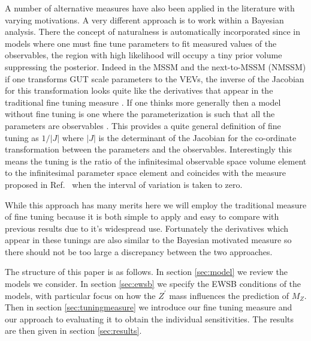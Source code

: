 \documentclass[preprint,amsmath,amssymb,aps,superscriptaddress,prd,
showpacs,floatfix,nofootinbib]{revtex4-1}
\begin{document}
A number of alternative measures have also been applied in the
literature \cite{Anderson:1994dz, Anderson:1994tr, Anderson:1995cp,
Anderson:1996ew, Ciafaloni:1996zh, Chan:1997bi, Barbieri:1998uv,
Giusti:1998gz, Casas:2003jx, Casas:2004uu, Casas:2004gh,
Casas:2006bd, Kitano:2005wc, Athron:2007ry, Athron:2007qr,
Baer:2012up} with varying motivations.  A very different approach is
to work within a Bayesian analysis.  There the concept of naturalness
is automatically incorporated since in models where one must fine tune
parameters to fit measured values of the observables, the region with
high likelihood will occupy a tiny prior volume \cite{Allanach:2007qk,
Cabrera:2008tj, Ghilencea:2012gz, Ghilencea:2012qk, Fichet:2012sn,
Kim:2013uxa} suppressing the posterior.  Indeed in the MSSM and
the next-to-MSSM (NMSSM) if one transforms GUT scale parameters to the
VEVs, the inverse of the Jacobian for this transformation looks quite like
the derivatives that appear in the traditional fine tuning measure
\cite{Allanach:2007qk, Cabrera:2008tj, Kim:2013uxa}.  If one thinks
more generally then a model without fine tuning is one where the
parameterization is such that all the parameters are observables
\cite{Fichet:2012sn, Kim:2013uxa}.  This provides a quite general
definition of fine tuning as $1/|J|$ where $|J|$ is the determinant of
the Jacobian for the co-ordinate transformation between the parameters
and the observables.  Interestingly this means the tuning is the ratio
of the infinitesimal observable space volume element to the
infinitesimal parameter space element and coincides with the measure
proposed in Ref.~\cite{Athron:2007ry} when the interval of variation is
taken to zero.

While this approach has many merits here we will employ the traditional
measure of fine tuning because it is both simple to apply and easy to
compare with previous results due to it's widespread use.  Fortunately
the derivatives which appear in these tunings are also similar to the
Bayesian motivated measure so there should not be too large a
discrepancy between the two approaches.

The structure of this paper is as follows.  In section \ref{sec:model}
we review the models we consider.  In section \ref{sec:ewsb} we
specify the EWSB conditions of the models, with particular focus on
how the $Z^\prime$ mass influences the prediction of $M_Z$.  Then in
section \ref{sec:tuningmeasure} we introduce our fine tuning measure
and our approach to evaluating it to obtain the individual
sensitivities.  The results are then given in section
\ref{sec:results}.
\end{document}
